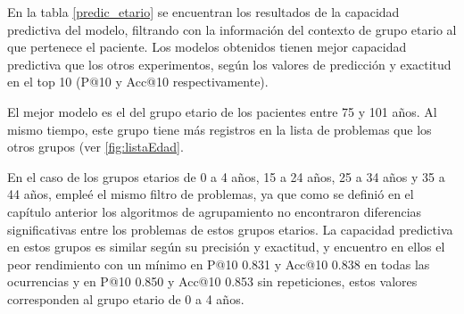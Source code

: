 En la tabla \ref{predic_etario} se encuentran los resultados de la capacidad predictiva del modelo, filtrando con la información del contexto de grupo etario al que pertenece el paciente. Los modelos obtenidos tienen mejor capacidad predictiva que los otros experimentos, según los valores de predicción y exactitud en el top 10 (P@10 y Acc@10 respectivamente).

El mejor modelo es el del grupo etario de los pacientes entre 75 y 101 años. Al mismo tiempo, este grupo tiene más registros en la lista de problemas que los otros grupos (ver \ref{fig:listaEdad}.

En el caso de los grupos etarios de 0 a 4 años, 15 a 24 años, 25 a 34 años y 35 a 44 años, empleé el mismo filtro de problemas, ya que como se definió en el capítulo anterior los algoritmos de agrupamiento no encontraron diferencias significativas entre los problemas de estos grupos etarios. La capacidad predictiva en estos grupos es similar según su precisión y exactitud, y encuentro en ellos el peor rendimiento con un mínimo en P@10 \num{0.831} y Acc@10 \num{0.838} en todas las ocurrencias y en P@10 \num{0.850} y Acc@10 \num{0.853} sin repeticiones, estos valores corresponden al grupo etario de 0 a 4 años.


